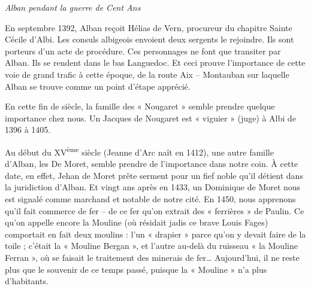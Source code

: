 
\begin{center}
    {\Large\itshape Alban pendant la guerre de Cent Ans}
\end{center}

\vspace{1.5em}

En septembre 1392, Alban reçoit Hélias de Vern, procureur du chapitre
Sainte Cécile d'Albi. Les consuls albigeois envoient deux sergents le
rejoindre. Ils sont porteurs d'un acte de procédure. Ces personnages ne
font que transiter par Alban. Ils se rendent dans le bas Languedoc. Et
ceci prouve l'importance de cette voie
de grand trafic à cette époque, de la route Aix -- Montauban sur laquelle
Alban se trouve comme un point d'étape apprécié.

\medskip

En cette fin de siècle, la famille des « Nougaret » semble prendre quelque
importance chez nous. Un Jacques de Nougaret est « viguier » (juge) à Albi
de 1396 à 1405.

\medskip

Au début du XV\textsuperscript{ème} siècle (Jeanne d'Arc naît en 1412),
une autre famille d'Alban, les De Moret, semble prendre de l'importance
dans notre coin. À cette date, en effet, Jehan de Moret prête serment pour
un fief noble qu'il détient dans la juridiction d'Alban. Et vingt ans
après en 1433, un Dominique de Moret nous est signalé comme marchand et
notable de notre cité. En 1450, nous apprenons qu'il fait commerce de fer
-- de ce fer qu'on extrait des « ferrières » de Paulin. Ce qu'on appelle
encore la Mouline (où résidait jadis ce brave Louis Fages) comportait en
fait deux moulins : l'un « drapier » parce qu'on y devait faire de la
toile ; c'était la « Mouline Bergan », et l'autre au-delà du ruisseau
« la Mouline Ferran », où se faisait le traitement des minerais de fer…
Aujourd'hui, il ne reste plus que le souvenir de ce temps passé, puisque
la « Mouline » n'a plus d'habitants.
